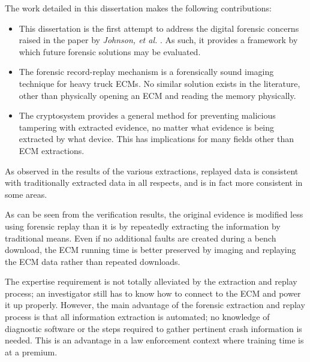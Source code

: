 

The work detailed in this dissertation makes the following contributions:

\begin{itemize}

  \item This dissertation is the first attempt to address the digital forensic concerns raised in the
        paper by \emph{Johnson, et al.} \cite{Johnson2014}. As such, it provides a framework by which future
        forensic solutions may be evaluated.
  \item The forensic record-replay mechanism is a forensically sound imaging technique for heavy truck ECMs.
        No similar solution exists in the literature, other than physically opening an ECM and reading the
        memory physically.
  \item The cryptosystem provides a general method for preventing malicious tampering with extracted evidence,
        no matter what evidence is being extracted by what device. This has implications for many fields other
        than ECM extractions.

\end{itemize}


As observed in the results of the various extractions, replayed data is consistent with
traditionally extracted data in all respects, and is in fact more consistent in some areas.


As can be seen from the verification results, the original evidence is modified less using forensic replay than it is by repeatedly
extracting the information by traditional means. Even if no additional faults are created during a bench download, the ECM running
time is better preserved by imaging and replaying the ECM data rather than repeated downloads.

The expertise requirement is not totally alleviated by the extraction and replay process; an investigator still has to know how to 
connect to the ECM and power it up properly. However, the main advantage of the forensic extraction and replay process is that
all information extraction is automated; no knowledge of diagnostic software or the steps required to gather pertinent crash information
is needed. This is an advantage in a law enforcement context where training time is at a premium.

